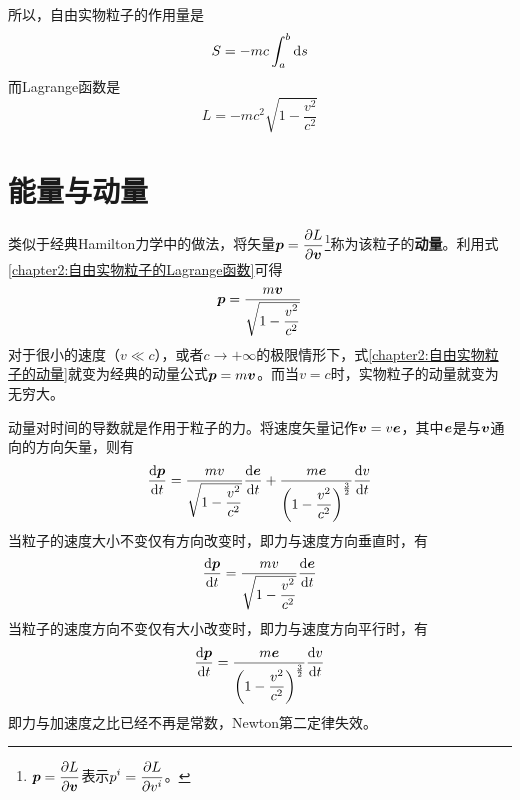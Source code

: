 所以，自由实物粒子的作用量是
\begin{equation}
	S = -mc\int_a^b \mathrm{d} s
	\label{chapter2:自由实物粒子的作用量}
\end{equation}
而Lagrange函数是
\begin{equation}
	L = -mc^2\sqrt{1-\dfrac{v^2}{c^2}}
	\label{chapter2:自由实物粒子的Lagrange函数}
\end{equation}

\section{能量与动量}

类似于经典Hamilton力学中的做法，将矢量$\boldsymbol{p} = \dfrac{\partial L}{\partial \boldsymbol{v}}$\footnote{$\boldsymbol{p} = \dfrac{\partial L}{\partial \boldsymbol{v}}$表示$\displaystyle p^i = \frac{\partial L}{\partial v^i}$。}称为该粒子的{\bf 动量}。利用式\eqref{chapter2:自由实物粒子的Lagrange函数}可得
\begin{equation}
	\boldsymbol{p} = \frac{m\boldsymbol{v}}{\sqrt{1-\dfrac{v^2}{c^2}}}
	\label{chapter2:自由实物粒子的动量}
\end{equation}
对于很小的速度（$v\ll c$），或者$c\to +\infty$的极限情形下，式\eqref{chapter2:自由实物粒子的动量}就变为经典的动量公式$\boldsymbol{p} = m\boldsymbol{v}$。而当$v=c$时，实物粒子的动量就变为无穷大。

动量对时间的导数就是作用于粒子的力。将速度矢量记作$\boldsymbol{v}=v\boldsymbol{e}$，其中$\boldsymbol{e}$是与$\boldsymbol{v}$通向的方向矢量，则有
\begin{equation}
	\frac{\mathrm{d} \boldsymbol{p}}{\mathrm{d} t} = \frac{mv}{\sqrt{1-\dfrac{v^2}{c^2}}} \frac{\mathrm{d} \boldsymbol{e}}{\mathrm{d} t} + \frac{m\boldsymbol{e}}{\left(1-\dfrac{v^2}{c^2}\right)^{\frac32}} \frac{\mathrm{d} v}{\mathrm{d} t}
\end{equation}
当粒子的速度大小不变仅有方向改变时，即力与速度方向垂直时，有
\begin{equation*}
	\frac{\mathrm{d} \boldsymbol{p}}{\mathrm{d} t} = \frac{mv}{\sqrt{1-\dfrac{v^2}{c^2}}} \frac{\mathrm{d} \boldsymbol{e}}{\mathrm{d} t}
\end{equation*}
当粒子的速度方向不变仅有大小改变时，即力与速度方向平行时，有
\begin{equation*}
	\frac{\mathrm{d} \boldsymbol{p}}{\mathrm{d} t} = \frac{m\boldsymbol{e}}{\left(1-\dfrac{v^2}{c^2}\right)^{\frac32}} \frac{\mathrm{d} v}{\mathrm{d} t}
\end{equation*}
即力与加速度之比已经不再是常数，Newton第二定律失效。

